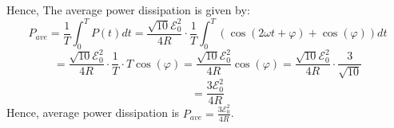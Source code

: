 \documentclass{article}
\begin{document}
\begin{itemize}
    Hence, The average power dissipation is given by:
    $$P_{ave}=\frac{1}{T}\int_{0}^{T}P(t)dt = \frac{\sqrt{10}\mathcal{E}_0^2}{4R}\cdot \frac{1}{T}\int_{0}^{T}(\cos(2\omega t+\varphi)+\cos(\varphi))dt$$
    $$=\frac{\sqrt{10}\mathcal{E}_0^2}{4R}\cdot\frac{1}{T}\cdot T\cos(\varphi) = \frac{\sqrt{10}\mathcal{E}_0^2}{4R}\cos(\varphi)=\frac{\sqrt{10}\mathcal{E}_0^2}{4R}\cdot\frac{3}{\sqrt{10}}$$
    $$=\frac{3\mathcal{E}_0^2}{4R}$$
    Hence, average power dissipation is $P_{ave}=\frac{3\mathcal{E}_0^2}{4R}$.
\end{itemize}
\end{document}
